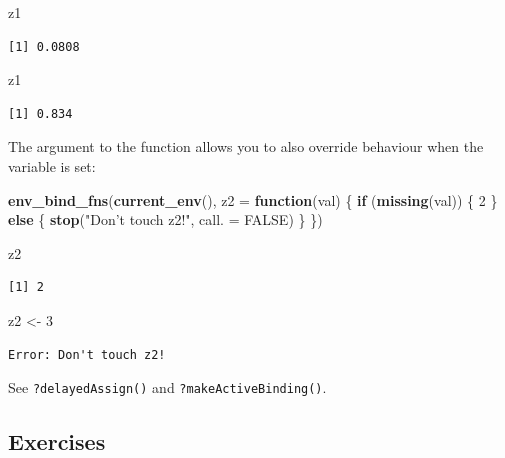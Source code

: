 \documentclass[]{book}
\newenvironment{Shaded}{\begin{snugshade}}{\end{snugshade}}
\newcommand{\ControlFlowTok}[1]{\textcolor[rgb]{0.13,0.29,0.53}{\textbf{#1}}}
\newcommand{\DataTypeTok}[1]{\textcolor[rgb]{0.13,0.29,0.53}{#1}}
\newcommand{\DecValTok}[1]{\textcolor[rgb]{0.00,0.00,0.81}{#1}}
\newcommand{\KeywordTok}[1]{\textcolor[rgb]{0.13,0.29,0.53}{\textbf{#1}}}
\newcommand{\NormalTok}[1]{#1}
\newcommand{\OtherTok}[1]{\textcolor[rgb]{0.56,0.35,0.01}{#1}}
\newcommand{\StringTok}[1]{\textcolor[rgb]{0.31,0.60,0.02}{#1}}
\theoremstyle{definition}
\theoremstyle{definition}
\theoremstyle{definition}
\theoremstyle{remark}
\begin{document}
\begin{itemize}
\begin{Shaded}
\begin{Highlighting}[]
\NormalTok{z1}
\end{Highlighting}
\end{Shaded}

\begin{verbatim}
[1] 0.0808
\end{verbatim}

\begin{Shaded}
\begin{Highlighting}[]
\NormalTok{z1}
\end{Highlighting}
\end{Shaded}

\begin{verbatim}
[1] 0.834
\end{verbatim}

  The argument to the function allows you to also override behaviour
  when the variable is set:

\begin{Shaded}
\begin{Highlighting}[]
\KeywordTok{env_bind_fns}\NormalTok{(}\KeywordTok{current_env}\NormalTok{(), }\DataTypeTok{z2 =} \ControlFlowTok{function}\NormalTok{(val) \{}
  \ControlFlowTok{if}\NormalTok{ (}\KeywordTok{missing}\NormalTok{(val)) \{}
    \DecValTok{2}
\NormalTok{  \} }\ControlFlowTok{else}\NormalTok{ \{}
     \KeywordTok{stop}\NormalTok{(}\StringTok{"Don't touch z2!"}\NormalTok{, }\DataTypeTok{call. =} \OtherTok{FALSE}\NormalTok{)}
\NormalTok{  \}}
\NormalTok{\})}

\NormalTok{z2}
\end{Highlighting}
\end{Shaded}

\begin{verbatim}
[1] 2
\end{verbatim}

\begin{Shaded}
\begin{Highlighting}[]
\NormalTok{z2 <-}\StringTok{ }\DecValTok{3}
\end{Highlighting}
\end{Shaded}

\begin{verbatim}
Error: Don't touch z2!
\end{verbatim}
\end{itemize}

See \texttt{?delayedAssign()} and \texttt{?makeActiveBinding()}.

\hypertarget{exercises-6}{%
\subsection{Exercises}\label{exercises-6}}
\end{document}
